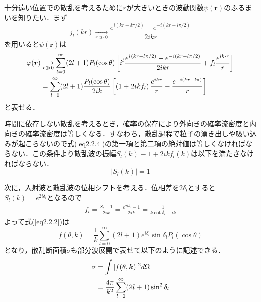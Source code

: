 \documentclass[11pt,a4j,notitlepage]{jreport}
\begin{document}
十分遠い位置での散乱を考えるために$r$が大きいときの波動関数$\psi(\bm{r})$のふるまいを知りたい．まず
\begin{equation}
	j_{l}(k r) \underset{r \gg 0}{\longrightarrow} \frac{e^{i(k r-l \pi / 2)}-e^{-i(k r-l \pi / 2)}}{2 i k r}
	\label{eq2.2.3}
\end{equation}
を用いると$\psi(\bm{r})$は
\begin{align}
	\varphi(\boldsymbol{r})
	& \underset{r \gg 0}{\longrightarrow} \sum_{l=0}^{\infty}(2 l+1) P_{l}(\cos \theta) \left[ i^{l} \frac{ e^{i(k r-l \pi / 2)}-e^{-i(k r-l \pi / 2)}}{2 i k r} + f_{l} \frac{e^{i k \cdot r}}{r} \right] \notag \\
	& = \sum_{l=0}^{\infty}(2 l+1) \frac{P_{l}(\cos \theta)}{2 i k}\left[\left(1+2 i k f_{l}\right) \frac{e^{ik r}}{r}-\frac{e^{-i(k r-l \pi)}}{r}\right]
	\label{eq2.2.4}
\end{align}
と表せる．

時間に依存しない散乱を考えるとき，確率の保存により外向きの確率流密度と内向きの確率流密度は等しくなる．すなわち，散乱過程で粒子の湧き出しや吸い込みが起こらないので式(\ref{eq2.2.4})の第一項と第二項の絶対値は等しくなければならない．この条件より散乱波の振幅$S_{l}(k) \equiv 1+2 i k f_{l}(k)$は以下を満たさなければならない．
\begin{equation}
	\left|S_{l}(k)\right|=1
	\label{eq2.2.5}
\end{equation}

次に，入射波と散乱波の位相シフトを考える．位相差を$2 \delta_{l}$とすると$S_{l}(k)=e^{2 i \delta_{l}}$となるので
\begin{align}
	f_{l}
	=\frac{S_{l}-1}{2 i k} = \frac{e^{2 i \delta_{l}}-1}{2 i k} = \frac{1}{k \cot \delta_{l}-i k}
	\label{eq2.2.6}
\end{align}
よって式(\ref{eq2.2.2})は
\begin{equation}
	f(\theta, k)=\frac{1}{k} \sum_{l=0}^{\infty}(2 l+1) e^{i \delta_{l}} \sin \delta_{l} P_{l}(\cos \theta)
	\label{eq2.2.7}
\end{equation}
となり，散乱断面積$\sigma$も部分波展開で表せて以下のように記述できる．
\begin{align}
	\sigma
	& = \int|f(\theta, k)|^{2} d \Omega \notag \\
	& = \frac{4 \pi}{k^{2}} \sum_{l=0}^{\infty}(2 l+1) \sin ^{2} \delta_{l}
	\label{eq2.2.8}
\end{align}
\end{document}
